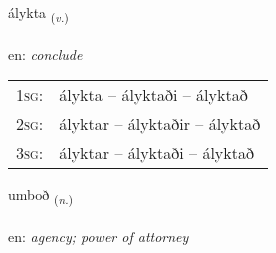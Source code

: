 \documentclass[frontgrid, backgrid]{flacards}\usepackage[]{graphicx}\usepackage[]{xcolor}
\begin{document}
\renewcommand{\flhead}{\vskip5pt \fboxsep=0pt {\small\bfseries\footnotesize Sagnorð | Verb}}
\renewcommand{\fcfoot}{\vskip5pt \fboxsep=0pt \hspace{2pt}{\small\bfseries\footnotesize 3K}}

\renewcommand{\blhead}{\vskip5pt {\small\bfseries\footnotesize Sagnorð | Verb }}
\renewcommand{\bcfoot}{\vskip5pt \hspace{2pt}{\small\bfseries\footnotesize 3K}}


{álykta \small{\textsubscript{(\textit{v.})}} \\[1ex] %
\textphonetic{[auːlɪxta]} \\
en: \emph{conclude} \\  [2ex]
\renewcommand*{\arraystretch}{0.8}
\begin{tabular}{p{1cm}l}
\textsc{1sg}: & álykta -- ályktaði -- ályktað \\ 
\textsc{2sg}: & ályktar -- ályktaðir -- ályktað \\ 
\textsc{3sg}: & ályktar -- ályktaði -- ályktað \\ 
\end{tabular}
}

\renewcommand{\flhead}{\vskip5pt \fboxsep=0pt {\small\bfseries\footnotesize Nafnorð | Noun}}
\renewcommand{\fcfoot}{\vskip5pt \fboxsep=0pt \hspace{2pt}{\small\bfseries\footnotesize 3K}}

\renewcommand{\blhead}{\vskip5pt {\small\bfseries\footnotesize Nafnorð | Noun }}
\renewcommand{\bcfoot}{\vskip5pt \hspace{2pt}{\small\bfseries\footnotesize 3K}}


{umboð \small{\textsubscript{(\textit{n.})}} \\[1ex] %
\textphonetic{[ʏmpɔð]} \\
en: \emph{agency; power of attorney} \\  [2ex]
\renewcommand*{\arraystretch}{0.8}
}
\end{document}
